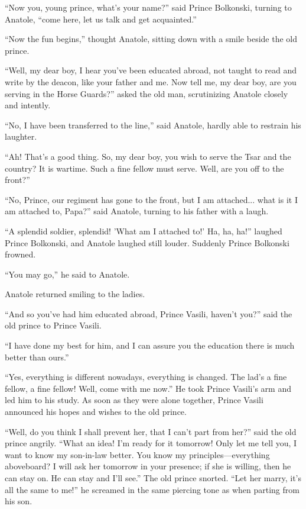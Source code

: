 ``Now you, young prince, what's your name?'' said Prince
Bolkonski, turning to Anatole, ``come here, let us talk and get
acquainted.''

``Now the fun begins,'' thought Anatole, sitting down with a
smile beside the old prince.

``Well, my dear boy, I hear you've been educated abroad, not
taught to read and write by the deacon, like your father and
me. Now tell me, my dear boy, are you serving in the Horse
Guards?'' asked the old man, scrutinizing Anatole closely and
intently.

``No, I have been transferred to the line,'' said Anatole, hardly
able to restrain his laughter.

``Ah! That's a good thing. So, my dear boy, you wish to serve the
Tsar and the country? It is wartime. Such a fine fellow must
serve. Well, are you off to the front?''

``No, Prince, our regiment has gone to the front, but I am
attached...  what is it I am attached to, Papa?'' said Anatole,
turning to his father with a laugh.

``A splendid soldier, splendid! 'What am I attached to!' Ha, ha,
ha!''  laughed Prince Bolkonski, and Anatole laughed still
louder. Suddenly Prince Bolkonski frowned.

``You may go,'' he said to Anatole.

Anatole returned smiling to the ladies.

``And so you've had him educated abroad, Prince Vasili, haven't
you?''  said the old prince to Prince Vasili.

``I have done my best for him, and I can assure you the education
there is much better than ours.''

``Yes, everything is different nowadays, everything is
changed. The lad's a fine fellow, a fine fellow! Well, come with
me now.'' He took Prince Vasili's arm and led him to his
study. As soon as they were alone together, Prince Vasili
announced his hopes and wishes to the old prince.

``Well, do you think I shall prevent her, that I can't part from
her?''  said the old prince angrily. ``What an idea! I'm ready
for it tomorrow!  Only let me tell you, I want to know my
son-in-law better. You know my principles---everything
aboveboard? I will ask her tomorrow in your presence; if she is
willing, then he can stay on. He can stay and I'll see.'' The old
prince snorted. ``Let her marry, it's all the same to me!''  he
screamed in the same piercing tone as when parting from his son.

